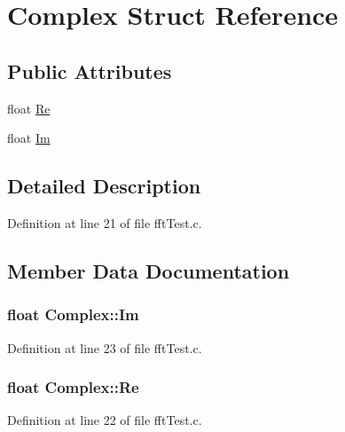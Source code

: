 \hypertarget{struct_complex}{}\section{Complex Struct Reference}
\label{struct_complex}
\subsection*{Public Attributes}
\begin{DoxyCompactItemize}
\item 
float \hyperlink{struct_complex_a2291ea8bc695ca5bfe56b862073e4027}{Re}
\item 
float \hyperlink{struct_complex_a22fd0e511929b7ab6c2e4fdcb4ff0090}{Im}
\end{DoxyCompactItemize}


\subsection{Detailed Description}


Definition at line 21 of file fft\+Test.\+c.



\subsection{Member Data Documentation}
\subsubsection[{\texorpdfstring{Im}{Im}}]{\setlength{\rightskip}{0pt plus 5cm}float Complex\+::\+Im}\hypertarget{struct_complex_a22fd0e511929b7ab6c2e4fdcb4ff0090}{}\label{struct_complex_a22fd0e511929b7ab6c2e4fdcb4ff0090}


Definition at line 23 of file fft\+Test.\+c.

\subsubsection[{\texorpdfstring{Re}{Re}}]{\setlength{\rightskip}{0pt plus 5cm}float Complex\+::\+Re}\hypertarget{struct_complex_a2291ea8bc695ca5bfe56b862073e4027}{}\label{struct_complex_a2291ea8bc695ca5bfe56b862073e4027}


Definition at line 22 of file fft\+Test.\+c.



